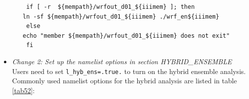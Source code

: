 \begin{itemize}[leftmargin=*]
\begin{scriptsize}
\begin{verbatim}
	if [ -r  ${mempath}/wrfout_d01_${iiimem} ]; then
   ln -sf ${mempath}/wrfout_d01_${iiimem} ./wrf_en${iiimem}
	else
   echo "member ${mempath}/wrfout_d01_${iiimem} does not exit"
	fi
\end{verbatim}
\end{scriptsize}

\item \textit{Change 2: Set up the namelist options in section HYBRID\_ENSEMBLE}\\

Users need to set \verb|l_hyb_ens=.true.| to turn on the hybrid ensemble analysis. Commonly used namelist options for the hybrid analysis are listed in table \ref{tab52}:


\end{itemize}
